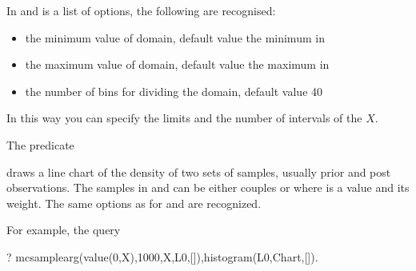 \documentclass[letterpaper,10pt,english]{sphinxmanual}
\begin{document}
In  and   is a list of options, the following are recognised:
\begin{itemize}
\item {} 
 the minimum value of domain, default value the minimum in 

\item {} 
 the maximum value of domain, default value the maximum in 

\item {} 
 the number of bins for dividing the domain, default value 40

\end{itemize}

In this way you can specify the limits and the number of intervals of the \(X\).

The predicate

\begin{sphinxVerbatim}[commandchars=\\\{\}]
  
\end{sphinxVerbatim}

draws a line chart of the density of two sets of samples, usually prior and post observations. The samples in  and  can be either couples  or  where  is a value and  its weight.
The same options as for  and  are recognized.

For example, the query

\begin{sphinxVerbatim}[commandchars=\\\{\}]
?\PYGZhy{}  mc\PYGZus{}sample\PYGZus{}arg(value(0,X),1000,X,L0,[]),histogram(L0,Chart,[]).
\end{sphinxVerbatim}
\end{document}
